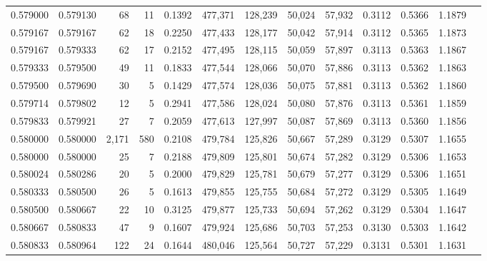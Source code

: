 \begin{tabular}{rrrrrrrrrrrrr}
0.579000 & 0.579130 &    68 &  11 &                                     0.1392 & 477,371 & 128,239 &  50,024 &  57,932 & 0.3112 & 0.5366 & 1.1879 \\
0.579167 & 0.579167 &    62 &  18 &                                     0.2250 & 477,433 & 128,177 &  50,042 &  57,914 & 0.3112 & 0.5365 & 1.1873 \\
0.579167 & 0.579333 &    62 &  17 &                                     0.2152 & 477,495 & 128,115 &  50,059 &  57,897 & 0.3113 & 0.5363 & 1.1867 \\
0.579333 & 0.579500 &    49 &  11 &                                     0.1833 & 477,544 & 128,066 &  50,070 &  57,886 & 0.3113 & 0.5362 & 1.1863 \\
0.579500 & 0.579690 &    30 &   5 &                                     0.1429 & 477,574 & 128,036 &  50,075 &  57,881 & 0.3113 & 0.5362 & 1.1860 \\
0.579714 & 0.579802 &    12 &   5 &                                     0.2941 & 477,586 & 128,024 &  50,080 &  57,876 & 0.3113 & 0.5361 & 1.1859 \\
0.579833 & 0.579921 &    27 &   7 &                                     0.2059 & 477,613 & 127,997 &  50,087 &  57,869 & 0.3113 & 0.5360 & 1.1856 \\
0.580000 & 0.580000 & 2,171 & 580 &                                     0.2108 & 479,784 & 125,826 &  50,667 &  57,289 & 0.3129 & 0.5307 & 1.1655 \\
0.580000 & 0.580000 &    25 &   7 &                                     0.2188 & 479,809 & 125,801 &  50,674 &  57,282 & 0.3129 & 0.5306 & 1.1653 \\
0.580024 & 0.580286 &    20 &   5 &                                     0.2000 & 479,829 & 125,781 &  50,679 &  57,277 & 0.3129 & 0.5306 & 1.1651 \\
0.580333 & 0.580500 &    26 &   5 &                                     0.1613 & 479,855 & 125,755 &  50,684 &  57,272 & 0.3129 & 0.5305 & 1.1649 \\
0.580500 & 0.580667 &    22 &  10 &                                     0.3125 & 479,877 & 125,733 &  50,694 &  57,262 & 0.3129 & 0.5304 & 1.1647 \\
0.580667 & 0.580833 &    47 &   9 &                                     0.1607 & 479,924 & 125,686 &  50,703 &  57,253 & 0.3130 & 0.5303 & 1.1642 \\
0.580833 & 0.580964 &   122 &  24 &                                     0.1644 & 480,046 & 125,564 &  50,727 &  57,229 & 0.3131 & 0.5301 & 1.1631 \\

\end{tabular}
